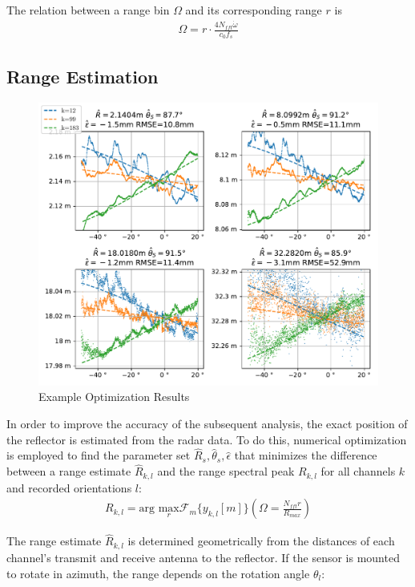 The relation between a range bin $\Omega$ and its corresponding range $r$ is
\begin{align}
    \Omega = r \cdot \frac{4N_{fft}\dot\omega}{c_0f_s}
\end{align}

\subsection{Range Estimation}
\label{ssec:range_est}

\begin{figure}
    \centering
    \includegraphics[width=\textwidth]{../figures/reflpos_estimate.pdf}
    \caption{Example Optimization Results}
    \label{fig:reflpos_estimate}
\end{figure}

In order to improve the accuracy of the subsequent analysis, the exact position of the reflector is estimated from the radar data.
To do this, numerical optimization is employed to find the parameter set $\hat R_s, \hat \theta_s, \hat \epsilon$ that minimizes the difference between
a range estimate $\hat R_{k,l}$ and the range spectral peak $R_{k,l}$ for all channels $k$ and recorded orientations $l$:
\begin{align}
    R_{k,l} = \text{arg } \underset{r}{\text{max}}\mathcal{F}_m\{y_{k,l}[m]\}\left(\Omega = \frac{N_{fft}r}{R_{max}}\right)
\end{align}

The range estimate $\hat R_{k,l}$ is determined geometrically from the distances of each channel's
transmit and receive antenna to the reflector. If the sensor is mounted to rotate in azimuth,
the range depends on the rotation angle $\theta_l $:

